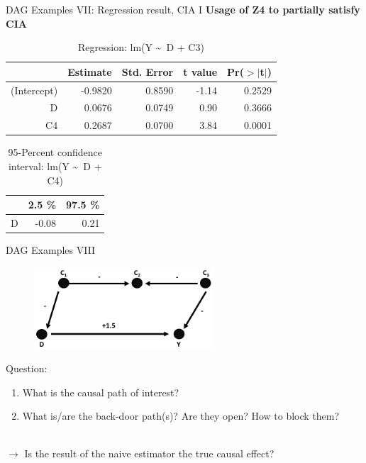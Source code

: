 \documentclass{beamer}\usepackage[]{graphicx}\usepackage[]{xcolor}
\begin{document}
\begin{frame}[fragile]{DAG Examples VII: Regression result, CIA I}
\textbf{Usage of Z4 to partially satisfy CIA}
\begin{table}[ht]
\centering
\begingroup\small
\begin{tabular}{rrrrr}
  \hline
 & Estimate & Std. Error & t value & Pr($>$$|$t$|$) \\ 
  \hline
(Intercept) & -0.9820 & 0.8590 & -1.14 & 0.2529 \\ 
  D & 0.0676 & 0.0749 & 0.90 & 0.3666 \\ 
  C4 & 0.2687 & 0.0700 & 3.84 & 0.0001 \\ 
   \hline
\end{tabular}
\endgroup
\caption{Regression: lm(Y \textasciitilde ~D + C3)} 
\end{table}
\begin{table}[ht]
\centering
\begingroup\small
\begin{tabular}{rrr}
  \hline
 & 2.5 \% & 97.5 \% \\ 
  \hline
D & -0.08 & 0.21 \\ 
   \hline
\end{tabular}
\endgroup
\caption{95-Percent confidence interval: lm(Y \textasciitilde ~D + C4)} 
\end{table}

\end{frame}



\begin{frame}{DAG Examples VIII}
\\[1em]
\begin{figure}
\centering
\includegraphics[width=0.6\textwidth]{Graphics/7.Collider.png}
\end{figure}
Question:
\begin{enumerate}
\item What is the causal path of interest?
\item What is/are the back-door path(s)? Are they open? How to block them?
\end{enumerate}
\\[1em]
$\rightarrow$ Is the result of the naive estimator the true causal effect?
\end{frame}
\end{document}
